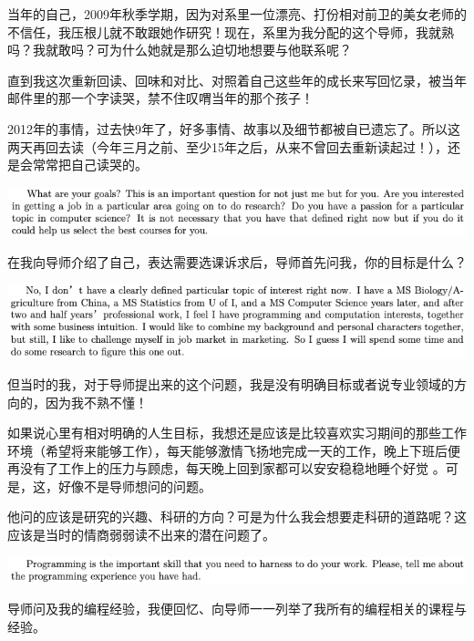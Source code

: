 \documentclass[9pt, b5paper]{article}
\begin{document}
当年的自己，2009年秋季学期，因为对系里一位漂亮、打份相对前卫的美女老师的不信任，我压根儿就不敢跟她作研究！现在，系里为我分配的这个导师，我就熟吗？我就敢吗？可为什么她就是那么迫切地想要与他联系呢？

直到我这次重新回读、回味和对比、对照着自己这些年的成长来写回忆录，被当年邮件里的那一个字读哭，禁不住叹喟当年的那个孩子！

2012年的事情，过去快9年了，好多事情、故事以及细节都被自已遗忘了。所以这两天再回去读（今年三月之前、至少15年之后，从来不曾回去重新读起过！），还是会常常把自己读哭的。

\begin{center}
\includegraphics[width=.9\linewidth]{./pic/backups_plans_20210420_114702.png}
\end{center}

在我向导师介绍了自己，表达需要选课诉求后，导师首先问我，你的目标是什么？

\begin{center}
\includegraphics[width=.9\linewidth]{./pic/backups_plans_20210419_084838.png}
\end{center}

但当时的我，对于导师提出来的这个问题，我是没有明确目标或者说专业领域的方向的，因为我不熟不懂！

如果说心里有相对明确的人生目标，我想还是应该是比较喜欢实习期间的那些工作环境（希望将来能够工作），每天能够激情飞扬地完成一天的工作，晚上下班后便再没有了工作上的压力与顾虑，每天晚上回到家都可以安安稳稳地睡个好觉 。可是，这，好像不是导师想问的问题。

他问的应该是研究的兴趣、科研的方向？可是为什么我会想要走科研的道路呢？这应该是当时的情商弱弱读不出来的潜在问题了。 

\begin{center}
\includegraphics[width=.9\linewidth]{./pic/backups_plans_20210420_121822.png}
\end{center}

导师问及我的编程经验，我便回忆、向导师一一列举了我所有的编程相关的课程与经验。
\end{document}
